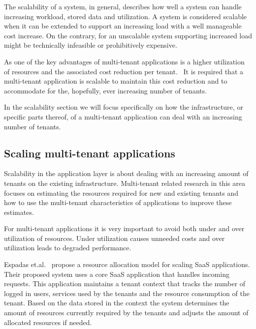 The scalability of a system, in general, describes how well a system can handle increasing workload, stored data and utilization.
A system is considered scalable when it can be extended to support an increasing load with a well manageable cost increase.
On the contrary, for an unscalable system supporting increased load might be technically infeasible or prohibitively expensive.~\cite{bondi2000scalability}

As one of the key advantages of multi-tenant applications is a higher utilization of resources and the associated cost reduction per tenant.~\cite{bezemer2010multi} 
It is required that a multi-tenant application is scalable to maintain this cost reduction and to accommodate for the, hopefully, ever increasing number of tenants.

In the scalability section we will focus specifically on how the infrastructure, or specific parts thereof, of a multi-tenant application can deal with an increasing number of tenants.

\subsection{Scaling multi-tenant applications}
Scalability in the application layer is about dealing with an increasing amount of tenants on the existing infrastructure.
Multi-tenant related research in this area focuses on estimating the resources required for new and existing tenants and how to use the multi-tenant characteristics of applications to improve these estimates. 

For multi-tenant applications it is very important to avoid both under and over utilization of resources.
Under utilization causes unneeded costs and over utilization leads to degraded performance.

Espadas et.al.~\cite{espadas2013tenant} propose a resource allocation model for scaling SaaS applications.
Their proposed system uses a core SaaS application that handles incoming requests.
This application maintains a tenant context that tracks the number of logged in users, services used by the tenants and the resource consumption of the tenant.
Based on the data stored in the context the system determines the amount of resources currently required by the tenants and adjusts the amount of allocated resources if needed.

